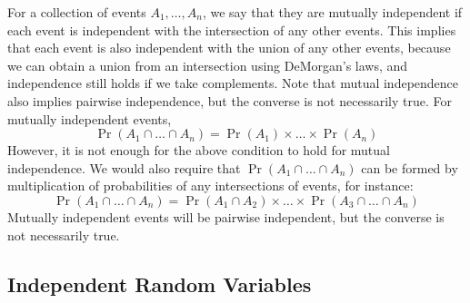 \documentclass[11pt]{report} %
\begin{document}
For a collection of events $A_{1}, \dots, A_{n}$, we say that they are mutually independent if each event is independent with the intersection of any other events. This implies that each event is also independent with the union of any other events, because we can obtain a union from an intersection using DeMorgan's laws, and independence still holds if we take complements. Note that mutual independence also implies pairwise independence, but the converse is not necessarily true. For mutually independent events,
\begin{equation}
\operatorname{Pr}\left(A_{1} \cap \dots \cap A_{n}\right) = \operatorname{Pr}\left(A_{1}\right)\times\dots\times\operatorname{Pr}\left(A_{n}\right)
\end{equation}
However, it is not enough for the above condition to hold for mutual independence. We would also require that $\operatorname{Pr}\left(A_{1} \cap \dots \cap A_{n}\right)$ can be formed by multiplication of probabilities of any intersections of events, for instance:
\begin{equation}
\operatorname{Pr}\left(A_{1} \cap \dots \cap A_{n}\right) = \operatorname{Pr}\left(A_{1} \cap A_{2}\right)\times\dots\times\operatorname{Pr}\left(A_{3} \cap \dots \cap A_{n}\right)
\end{equation}
Mutually independent events will be pairwise independent, but the converse is not necessarily true.

\subsection{Independent Random Variables}
\end{document}
